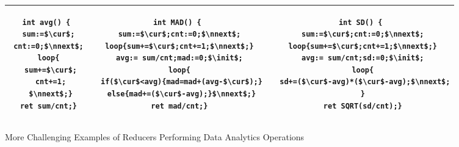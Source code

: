 \vspace{-0.7cm}
\begin{figure}
	\centering
	\lstset{language=C,
		basicstyle=\ttfamily\scriptsize}
	\begin{tabular}{|c|c|c|}
		\hline
		\begin{minipage}[t]{0.2\textwidth}
		\vspace{-0.5cm}
			\begin{lstlisting}[mathescape=true]
int avg() {
 sum:=$\cur$;
 cnt:=0;$\nnext$;
 loop{
  sum+=$\cur$;
  cnt+=1;
  $\nnext$;}
 ret sum/cnt;}
			\end{lstlisting}
		\end{minipage}&
		\begin{minipage}[t]{0.4\textwidth}
		\vspace{-0.5cm}
\begin{lstlisting}[mathescape=true]
int MAD() {
 sum:=$\cur$;cnt:=0;$\nnext$;
 loop{sum+=$\cur$;cnt+=1;$\nnext$;}
 avg:= sum/cnt;mad:=0;$\init$;
 loop{
  if($\cur$<avg){mad=mad+(avg-$\cur$);}
  else{mad+=($\cur$-avg);}$\nnext$;}
 ret mad/cnt;}
\end{lstlisting}
		\end{minipage}&
		\begin{minipage}[t]{0.4\textwidth}
		\vspace{-0.5cm}
			\begin{lstlisting}[mathescape=true]
int SD() {
 sum:=$\cur$;cnt:=0;$\nnext$;
 loop{sum+=$\cur$;cnt+=1;$\nnext$;}
 avg:= sum/cnt;sd:=0;$\init$;
 loop{
  sd+=($\cur$-avg)*($\cur$-avg);$\nnext$;
 }
 ret SQRT(sd/cnt);}
			\end{lstlisting}
		\end{minipage}\\
		\hline		
	\end{tabular}
	\caption{More Challenging Examples of Reducers Performing Data Analytics Operations}
	\label{fig:examples2}
\vspace{-0.5cm}
\end{figure}

